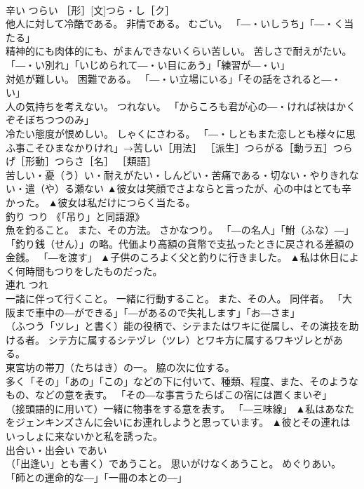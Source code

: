 \documentclass[8pt]{extreport}
\begin{document}
\begin{CJK}{UTF8}{min}
\\	辛い	つらい	［形］[文]つら・し［ク］ 
\\	他人に対して冷酷である。 非情である。 むごい。 「―・いしうち」「―・く当たる」 
\\	精神的にも肉体的にも、がまんできないくらい苦しい。 苦しさで耐えがたい。 「―・い別れ」「いじめられて―・い目にあう」「練習が―・い」 
\\	対処が難しい。 困難である。 「―・い立場にいる」「その話をされると―・い」 
\\	人の気持ちを考えない。 つれない。 「からころも君が心の―・ければ袂はかくぞそぼちつつのみ」 
\\	冷たい態度が恨めしい。 しゃくにさわる。 「―・しともまた恋しとも様々に思ふ事こそひまなかりけれ」→苦しい［用法］ ［派生］つらがる［動ラ五］つらげ［形動］つらさ［名］ ［類語］
\\	苦しい・憂（う）い・耐えがたい・しんどい・苦痛である・切ない・やりきれない・遣（や）る瀬ない	▲彼女は笑顔でさよならと言ったが、心の中はとても辛かった。 ▲彼女は私だけにつらく当たる。
\\	釣り	つり	《「吊り」と同語源》 
\\	魚を釣ること。 また、その方法。 さかなつり。 「―の名人」「鮒（ふな）―」 
\\	「釣り銭（せん）」の略。代価より高額の貨幣で支払ったときに戻される差額の金銭。 「―を渡す」	▲子供のころよく父と釣りに行きました。 ▲私は休日によく何時間もつりをしたものだった。
\\	連れ	つれ	
\\	一諸に伴って行くこと。 一緒に行動すること。 また、その人。 同伴者。 「大阪まで車中の―ができる」「―があるので失礼します」「お―さま」 
\\	（ふつう「ツレ」と書く）能の役柄で、シテまたはワキに従属し、その演技を助ける者。 シテ方に属するシテヅレ（ツレ）とワキ方に属するワキヅレとがある。 
\\	東宮坊の帯刀（たちはき）の一。 脇の次に位する。 
\\	多く「その」「あの」「この」などの下に付いて、種類、程度、また、そのようなもの、などの意を表す。 「その―な事言うたらばこの宿には置くまいぞ」 
\\	（接頭語的に用いて）一緒に物事をする意を表す。 「―三味線」	▲私はあなたをジェンキンズさんに会いにお連れしようと思っています。 ▲彼とその連れはいっしょに来ないかと私を誘った。
\\	出合い・出会い	であい	
\\	（「出逢い」とも書く）であうこと。 思いがけなくあうこと。 めぐりあい。 「師との運命的な―」「一冊の本との―」 

\end{CJK}
\end{document}
